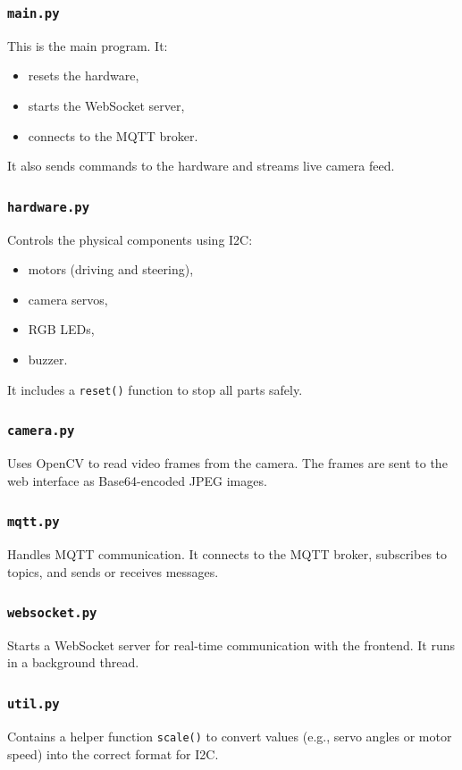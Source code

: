     \subsubsection*{\texttt{main.py}}
    This is the main program. It:
    \begin{itemize}
        \item resets the hardware,
        \item starts the WebSocket server,
        \item connects to the MQTT broker.
    \end{itemize}
    It also sends commands to the hardware and streams live camera feed.

    \subsubsection*{\texttt{hardware.py}}
    Controls the physical components using I2C:
    \begin{itemize}
        \item motors (driving and steering),
        \item camera servos,
        \item RGB LEDs,
        \item buzzer.
    \end{itemize}
    It includes a \texttt{reset()} function to stop all parts safely.

    \subsubsection*{\texttt{camera.py}}
    Uses OpenCV to read video frames from the camera. The frames are sent to the web interface as Base64-encoded JPEG images.

    \subsubsection*{\texttt{mqtt.py}}
    Handles MQTT communication. It connects to the MQTT broker, subscribes to topics, and sends or receives messages.

    \subsubsection*{\texttt{websocket.py}}
    Starts a WebSocket server for real-time communication with the frontend. It runs in a background thread.

    \subsubsection*{\texttt{util.py}}
    Contains a helper function \texttt{scale()} to convert values (e.g., servo angles or motor speed) into the correct format for I2C.

